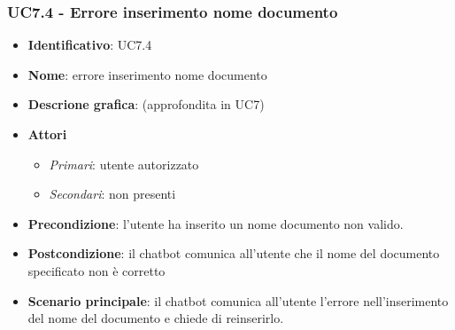 \subsubsection{UC7.4 - Errore inserimento nome documento}
\begin{itemize}
    \item \textbf{Identificativo}: UC7.4
    \item \textbf{Nome}: errore inserimento nome documento
    \item \textbf{Descrione grafica}: (approfondita in UC7)
    \item \textbf{Attori}
 \begin{itemize} 
    \item \textit{Primari}: utente autorizzato
    \item \textit{Secondari}: non presenti
 \end{itemize}
 \item \textbf{Precondizione}: l'utente ha inserito un nome documento non valido.
 \item \textbf{Postcondizione}:  il chatbot comunica all'utente che il nome del documento specificato non è corretto
 \item \textbf{Scenario principale}: il chatbot comunica all'utente l'errore nell'inserimento del nome del documento e chiede di reinserirlo.
\end{itemize}
\newpage